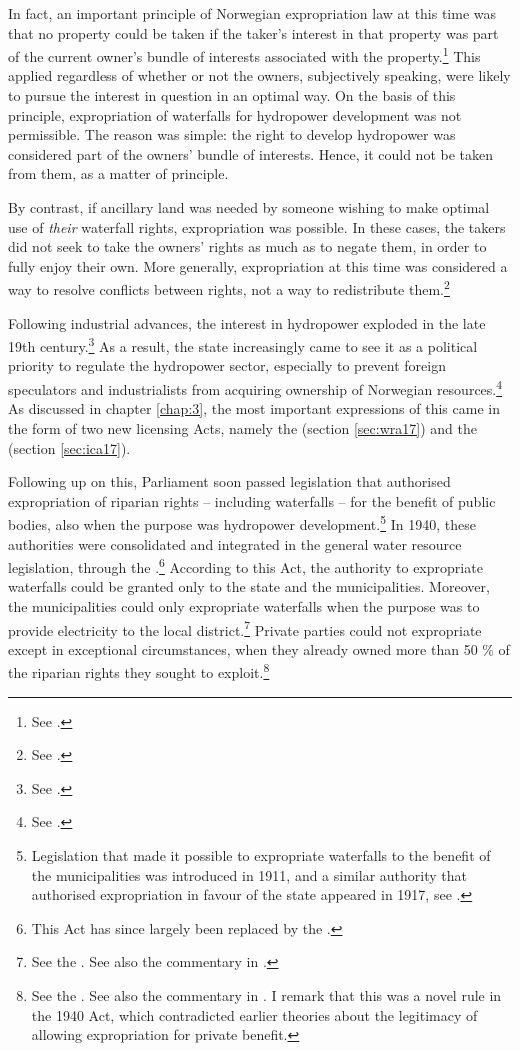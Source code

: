 In fact, an important principle of Norwegian expropriation law at this time was that no property could be taken if the taker's interest in that property was part of the current owner's bundle of interests associated with the property.\footnote{See \cite[168-170]{dahl88}.} This applied regardless of whether or not the owners, subjectively speaking, were likely to pursue the interest in question in an optimal way. On the basis of this principle, expropriation of waterfalls for hydropower development was not permissible. The reason was simple: the right to develop hydropower was considered part of the owners' bundle of interests. Hence, it could not be taken from them, as a matter of principle.

By contrast, if ancillary land was needed by someone wishing to make optimal use of {\it their} waterfall rights, expropriation was possible. In these cases, the takers did not seek to take the owners' rights as much as to negate them, in order to fully enjoy their own. More generally, expropriation at this time was considered a way to resolve conflicts between rights, not a way to redistribute them.\footnote{See \cite[168-170]{dahl88}.}

Following industrial advances, the interest in hydropower exploded in the late 19th century.\footnote{See \cite[58-59]{falkanger87}.} As a result, the state increasingly came to see it as a political priority to regulate the hydropower sector, especially to prevent foreign speculators and industrialists from acquiring ownership of Norwegian resources.\footnote{See \cite[58-59]{falkanger87}.} As discussed in chapter \ref{chap:3}, the most important expressions of this came in the form of two new licensing Acts, namely the \cite{wra17} (section \ref{sec:wra17}) and the \cite{ica17} (section \ref{sec:ica17}).

Following up on this, Parliament soon passed legislation that authorised expropriation of riparian rights -- including waterfalls -- for the benefit of public bodies, also when the purpose was hydropower development.\footnote{Legislation that made it possible to expropriate waterfalls to the benefit of the municipalities was introduced in 1911, and a similar authority that authorised expropriation in favour of the state appeared in 1917, see \cite[29]{amundsen28}.} In 1940, these authorities were consolidated and integrated in the general water resource legislation, through the \cite{wra40}.\footnote{This Act has since largely been replaced by the \cite{wra00}.} According to this Act, the authority to expropriate waterfalls could be granted only to the state and the municipalities. Moreover, the municipalities could only expropriate waterfalls when the purpose was to provide electricity to the local district.\footnote{See the \dni\cite[148]{wra40}. See also the commentary in \cite[201-210]{sorensen41}.} Private parties could not expropriate except in exceptional circumstances, when they already owned more than 50 \% of the riparian rights they sought to exploit.\footnote{See the \dni\cite[55]{wra40}. See also the commentary in \cite[70-74]{sorensen41}. I remark that this was a novel rule in the 1940 Act, which contradicted earlier theories about the legitimacy of allowing expropriation for private benefit.} 

